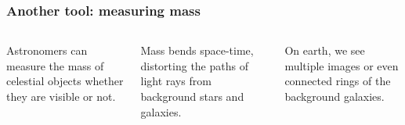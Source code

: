 \documentclass[compress]{beamer}
\begin{document}
\begin{frame}
\frametitle{Another tool: measuring mass}
\begin{columns}
\begin{minipage}{6.5 cm}
Astronomers can measure the mass of celestial objects whether they are
visible or not.
\end{minipage}

\vspace{0.25 cm}
\begin{minipage}{5.5 cm}
Mass bends space-time, distorting the paths of
light rays from background stars and galaxies.
\end{minipage}

\vspace{0.25 cm}
\begin{minipage}{5 cm}
On earth, we see multiple images or even connected rings of the
background galaxies.
\end{minipage}


\end{columns}
\end{frame}
\end{document}
